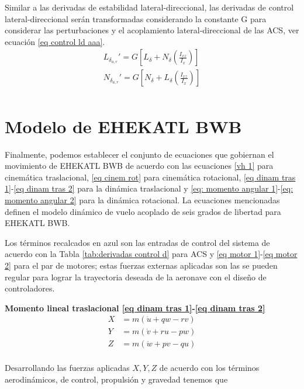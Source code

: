 Similar a las derivadas de estabilidad lateral-direccional, las derivadas de control lateral-direccional serán transformadas considerando la constante G para considerar las perturbaciones y el acoplamiento lateral-direccional de las ACS, ver ecuación \ref{eq control ld aaa}. 
\begin{gather}
\label{eq control ld aaa}
    L_{\delta_{a,r}} ' = G [L_\delta + N_\delta (\frac{I_{xz}}{I_x})] \\
    N_{\delta_{a,r}} ' = G [N_\delta + L_\delta (\frac{I_{xz}}{I_x})] \\
\end{gather}

\section{Modelo de EHEKATL BWB}

Finalmente, podemos establecer el conjunto de ecuaciones que gobiernan el movimiento de EHEKATL BWB de acuerdo con las ecuaciones \ref{vh 1} para cinemática traslacional, \ref{eq cinem rot} para cinemática rotacional, \ref{eq dinam tras 1}-\ref{eq dinam tras 2} para la dinámica traslacional y 
\ref{eq: momento angular 1}-\ref{eq: momento angular 2} para la dinámica rotacional. La ecuaciones mencionadas definen el modelo dinámico de vuelo acoplado de seis grados de libertad para EHEKATL BWB.

Los términos recalcados en azul son las entradas de control del sistema de acuerdo con la Tabla \ref{tab:derivadas control d} para ACS y \ref{eq motor 1}-\ref{eq motor 2} para el par de motores; estas fuerzas externas aplicadas son las se pueden regular para lograr la trayectoria deseada de la aeronave con el diseño de controladores.

\medskip

\textbf{Momento lineal traslacional \ref{eq dinam tras 1}-\ref{eq dinam tras 2}}\\
\begin{align}
\label{eq fuerzas ya 1}
    X &= m (\dot u + qw - rv) \\
    Y &= m (\dot v + ru - pw) \\
    Z &= m (\dot w + pv - qu) \\
\label{eq fuerzas ya 2}
\end{align}

Desarrollando las fuerzas aplicadas $X,Y,Z$ de acuerdo con los términos aerodinámicos, de control, propulsión y gravedad tenemos que 

